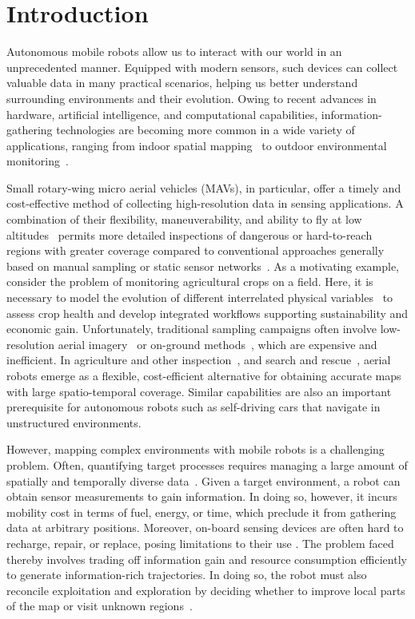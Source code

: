 \section{Introduction}
\label{S:introduction}

Autonomous mobile robots allow us to interact with our world in an unprecedented manner. Equipped 
with modern sensors, such devices can collect valuable data in many practical scenarios, helping us better 
understand surrounding environments and their evolution. Owing to recent advances in hardware, artificial 
intelligence, and computational capabilities, information-gathering technologies are becoming more 
common in a wide variety of applications, ranging from indoor spatial mapping~\cite{Charrow2015, 
Heng2014} to outdoor environmental monitoring~\cite{Dunbabin2012, Detweiler2015}.

Small rotary-wing micro aerial vehicles (MAVs), in particular, offer a timely and cost-effective method of 
collecting high-resolution data in sensing applications. A combination of their flexibility, maneuverability, 
and ability to fly at low altitudes~\cite{Anthony2014} permits more detailed inspections of dangerous or 
hard-to-reach regions with greater coverage compared to conventional approaches generally based on manual 
sampling or static sensor networks~\cite{Dunbabin2012, Krause2008, Phillips2012}. As a motivating example, 
consider the problem of monitoring agricultural crops on a field. Here, it is necessary to model the 
evolution of different interrelated physical variables~\cite{Cardina1997, Anthony2014, Detweiler2015} to 
assess crop health and develop integrated workflows supporting sustainability and economic gain. 
Unfortunately, traditional sampling campaigns often involve low-resolution aerial imagery~\cite{DeCastro2013} 
or on-ground methods~\cite{Borra-Serrano2015}, which are expensive and inefficient. In agriculture and other 
inspection~\cite{Isler2016,Bircher2016,Heng2015}, and search and rescue~\cite{Singh2009,Lim2015}, aerial 
robots 
emerge as a flexible, cost-efficient alternative for obtaining accurate maps with large spatio-temporal 
coverage. Similar capabilities are also an important prerequisite for autonomous robots such as 
self-driving cars that navigate in unstructured environments.

However, mapping complex environments with mobile robots is a challenging problem. Often, 
quantifying target processes requires managing a large amount of spatially and temporally diverse 
data~\cite{Dunbabin2012}. Given a target environment, a robot can obtain sensor measurements to gain 
information. In doing so, however, it incurs mobility cost in terms of fuel, energy, or time, which preclude 
it from gathering data at arbitrary positions. Moreover, on-board sensing devices are often hard to recharge, 
repair, or replace, posing limitations to their use \cite{Singh2009}. The problem faced thereby involves 
trading off information gain and resource consumption efficiently to generate information-rich trajectories. 
In doing so, the robot must also reconcile exploitation and exploration by deciding whether to improve local 
parts of the map or visit unknown regions~\cite{Charrow2015a}.

